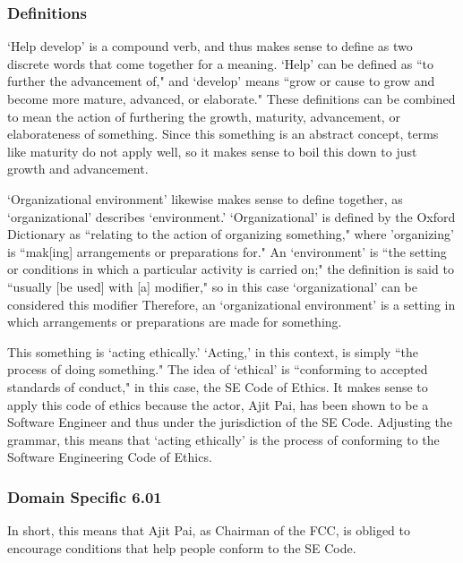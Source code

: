\documentclass[12pt]{article}
\begin{document}
\begin{multicols}{2}
  \subsubsection{Definitions}
  `Help develop' is a compound verb, and thus makes sense to define as two discrete words that come together for a meaning. `Help' can be defined as ``to further the advancement of," and `develop' means ``grow or cause to grow and become more mature, advanced, or elaborate."\cite{webster, oxford} These definitions can be combined to mean the action of furthering the growth, maturity, advancement, or elaborateness of something. Since this something is an abstract concept, terms like maturity do not apply well, so it makes sense to boil this down to just growth and advancement.
  
  `Organizational environment' likewise makes sense to define together, as `organizational' describes `environment.' `Organizational' is defined by the Oxford Dictionary as ``relating to the action of organizing something," where 'organizing' is ``mak[ing] arrangements or preparations for."\cite{oxford} An `environment' is ``the setting or conditions in which a particular activity is carried on;" the definition is said to ``usually [be used] with [a] modifier," so in this case `organizational' can be considered this modifier\cite{oxford} Therefore, an `organizational environment' is a setting in which arrangements or preparations are made for something.
  
  This something is `acting ethically.' `Acting,' in this context, is simply ``the process of doing something."\cite{webster} The idea of `ethical' is ``conforming to accepted standards of conduct," in this case, the SE Code of Ethics.\cite{webster} It makes sense to apply this code of ethics because the actor, Ajit Pai, has been shown to be a Software Engineer and thus under the jurisdiction of the SE Code. Adjusting the grammar, this means that `acting ethically' is the process of conforming to the Software Engineering Code of Ethics.
  
  \subsubsection{Domain Specific 6.01}
	
	In short, this means that Ajit Pai, as Chairman of the FCC, is obliged to encourage conditions that help people conform to the SE Code.
	

\end{multicols}
\end{document}
